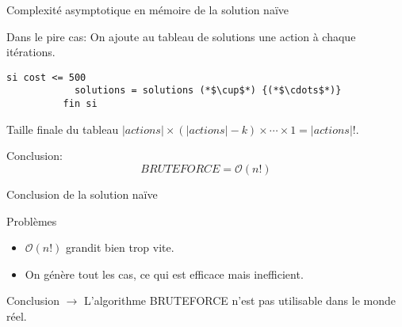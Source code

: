 \begin{frame}[fragile]{Complexité asymptotique en mémoire de la solution naïve}
  \begin{block}{Dans le pire cas:}
    On ajoute au tableau de solutions une action à chaque itérations.
    \begin{center}
      \tiny
      \begin{lstlisting}[numbers=none, frame=none]
          si cost <= 500
            solutions = solutions (*$\cup$*) {(*$\cdots$*)}
          fin si
      \end{lstlisting}
    \end{center}
  \end{block}

  \begin{block}{Taille finale du tableau}
    $|actions| \times (|actions| - k)\times \cdots \times 1 = |actions|!$.
  \end{block}

  \begin{block}{Conclusion:}
    \begin{equation}
      BRUTEFORCE = \mathcal{O}(n!)
    \end{equation}
  \end{block}
\end{frame}

\begin{frame}{Conclusion de la solution naïve}
  \begin{block}{Problèmes}
    \begin{itemize}
    \item $\mathcal{O}(n!)$ grandit bien trop vite.
    \item On génère tout les cas, ce qui est efficace mais inefficient.
    \end{itemize}
  \end{block}

  \begin{block}{Conclusion}
    $\rightarrow$ L'algorithme BRUTEFORCE n'est pas utilisable dans le
    monde réel.
  \end{block}
\end{frame}
